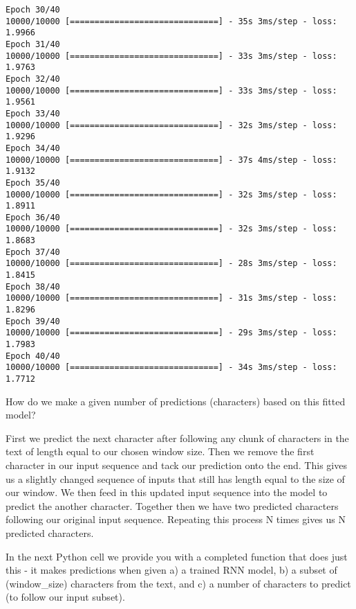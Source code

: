 \documentclass[11pt]{article}
\begin{document}
\begin{Verbatim}[commandchars=\\\{\}]
Epoch 30/40
10000/10000 [==============================] - 35s 3ms/step - loss: 1.9966
Epoch 31/40
10000/10000 [==============================] - 33s 3ms/step - loss: 1.9763
Epoch 32/40
10000/10000 [==============================] - 33s 3ms/step - loss: 1.9561
Epoch 33/40
10000/10000 [==============================] - 32s 3ms/step - loss: 1.9296
Epoch 34/40
10000/10000 [==============================] - 37s 4ms/step - loss: 1.9132
Epoch 35/40
10000/10000 [==============================] - 32s 3ms/step - loss: 1.8911
Epoch 36/40
10000/10000 [==============================] - 32s 3ms/step - loss: 1.8683
Epoch 37/40
10000/10000 [==============================] - 28s 3ms/step - loss: 1.8415
Epoch 38/40
10000/10000 [==============================] - 31s 3ms/step - loss: 1.8296
Epoch 39/40
10000/10000 [==============================] - 29s 3ms/step - loss: 1.7983
Epoch 40/40
10000/10000 [==============================] - 34s 3ms/step - loss: 1.7712

    \end{Verbatim}

    How do we make a given number of predictions (characters) based on this
fitted model?

First we predict the next character after following any chunk of
characters in the text of length equal to our chosen window size. Then
we remove the first character in our input sequence and tack our
prediction onto the end. This gives us a slightly changed sequence of
inputs that still has length equal to the size of our window. We then
feed in this updated input sequence into the model to predict the
another character. Together then we have two predicted characters
following our original input sequence. Repeating this process N times
gives us N predicted characters.

In the next Python cell we provide you with a completed function that
does just this - it makes predictions when given a) a trained RNN model,
b) a subset of (window\_size) characters from the text, and c) a number
of characters to predict (to follow our input subset).
\end{document}
